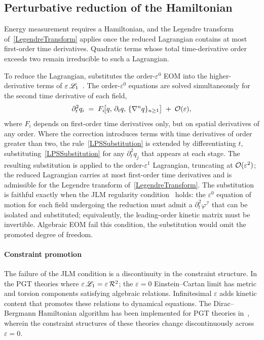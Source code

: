 \subsection{Perturbative reduction of the Hamiltonian}%
\label{HamiltonianReduction}
Energy measurement requires a Hamiltonian, and the Legendre transform
of~\cref{LegendreTransform} applies once the reduced Lagrangian contains
at most first-order time derivatives.
Quadratic terms whose total time-derivative order exceeds two remain irreducible to such a
Lagrangian.

To reduce the Lagrangian, \TIDAL{} substitutes the
order-$\varepsilon^0$ EOM into the higher-derivative terms of
$\varepsilon\,\mathscr{L}_1$~\cite{jaen1986reduction,Cheyette1988,Grosse-Knetter:1993tae}.
The order-$\varepsilon^0$ equations are solved simultaneously for the second time
derivative of each field,
\begin{equation}
  \partial_t^2 q_i
  \;=\;
  F_i\!\bigl[q,\,\partial_t q,\,\{\nabla^n q\}_{n\geq 1}\bigr]
  \;+\; \mathcal{O}(\varepsilon),
  \label{LPSSubstitution}
\end{equation}
where $F_i$ depends on first-order time derivatives only, but on spatial derivatives of
any order.
Where the correction introduces terms with time derivatives of order greater than two,
the rule~\cref{LPSSubstitution} is extended by differentiating \wrt $t$,
substituting~\cref{LPSSubstitution} for any $\partial_t^2 q_j$
that appears at each stage.
The resulting substitution is applied to the order-$\varepsilon^1$ Lagrangian,
truncating at $\mathcal{O}(\varepsilon^2)$; the reduced Lagrangian carries at
most first-order time derivatives and is admissible for the Legendre transform of~\cref{LegendreTransform}.
The substitution is faithful exactly when the JLM regularity
condition~\cite{jaen1986reduction} holds: the $\varepsilon^0$ equation of motion for
each field undergoing the reduction must admit a $\partial_t^2\varphi^{\mathcal{I}}$
that can be isolated and
substituted; equivalently, the leading-order kinetic matrix must be invertible.
Algebraic EOM fail this condition, the substitution would omit
the promoted degree of freedom.

\paragraph*{Constraint promotion}
The failure of the JLM condition is a discontinuity in the constraint structure.
In the PGT theories where $\varepsilon\,\lag_1 = \varepsilon\,\MAGF{^2}$; the $\varepsilon = 0$
Einstein--Cartan limit has metric and torsion components satisfying algebraic
relations. Infinitesimal $\varepsilon$ adds kinetic content that promotes
these relations to dynamical equations. The Dirac--Bergmann Hamiltonian algorithm has been implemented for
PGT theories in~\cite{barker2021hamiltonian,barker2023higgs}, wherein
the constraint structures of these theories change discontinuously across $\varepsilon = 0$.

